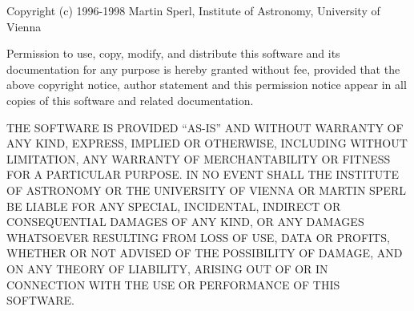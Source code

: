 Copyright (c) 1996-1998 Martin Sperl,
Institute of Astronomy,
University of Vienna

Permission to use, copy, modify, and distribute this software and its
documentation for any purpose is hereby granted without fee, provided that the
above copyright notice, author statement and this permission notice appear in
all copies of this software and related documentation.

THE SOFTWARE IS PROVIDED ``AS-IS'' AND WITHOUT WARRANTY OF ANY KIND, EXPRESS,
IMPLIED OR OTHERWISE, INCLUDING WITHOUT LIMITATION, ANY WARRANTY OF
MERCHANTABILITY OR FITNESS FOR A PARTICULAR PURPOSE.
IN NO EVENT SHALL THE INSTITUTE OF ASTRONOMY OR THE UNIVERSITY OF VIENNA OR
MARTIN SPERL BE LIABLE FOR ANY SPECIAL, INCIDENTAL, INDIRECT OR 
CONSEQUENTIAL DAMAGES OF ANY KIND, OR ANY DAMAGES WHATSOEVER RESULTING
FROM LOSS OF USE, DATA OR PROFITS, WHETHER OR NOT ADVISED OF THE
POSSIBILITY OF DAMAGE, AND ON ANY THEORY OF LIABILITY, ARISING OUT OF
OR IN CONNECTION WITH THE USE OR PERFORMANCE OF THIS SOFTWARE.